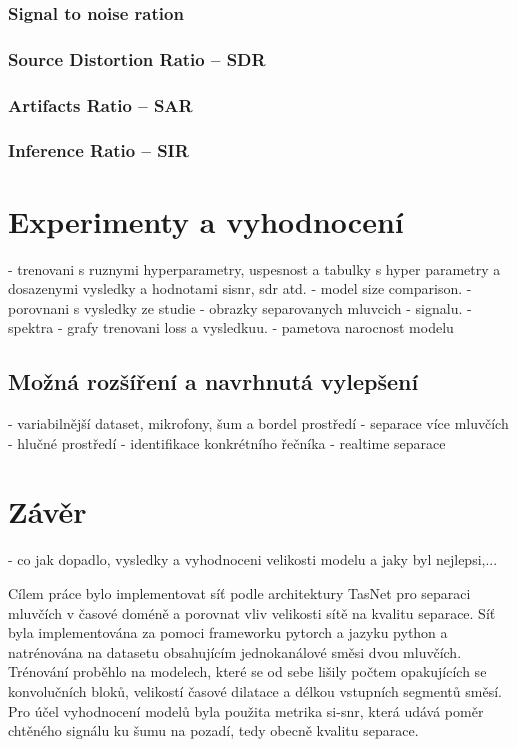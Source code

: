 \subsection{Signal to noise ration}
\subsection*{Source Distortion Ratio -- SDR}
\subsection*{Artifacts Ratio -- SAR}
\subsection*{Inference Ratio -- SIR}





\chapter{Experimenty a vyhodnocení}
\label{experimenty}
- trenovani s ruznymi hyperparametry, uspesnost a tabulky s hyper parametry a dosazenymi vysledky a hodnotami sisnr, sdr atd.
- model size comparison.
- porovnani s vysledky ze studie
- obrazky separovanych mluvcich - signalu.
- spektra
- grafy trenovani loss a vysledkuu.
- pametova narocnost modelu


\section{Možná rozšíření a navrhnutá vylepšení}
- variabilnější dataset, mikrofony, šum a bordel prostředí
- separace více mluvčích
- hlučné prostředí
- identifikace konkrétního řečníka
- realtime separace


\chapter{Závěr}
\label{zaver}
- co jak dopadlo, vysledky a vyhodnoceni velikosti modelu a jaky byl nejlepsi,...

Cílem práce bylo implementovat síť podle architektury TasNet pro separaci mluvčích v časové doméně a porovnat vliv velikosti sítě na kvalitu separace. Síť byla implementována za pomoci frameworku pytorch a jazyku python a natrénována na datasetu obsahujícím jednokanálové směsi dvou mluvčích. Trénování proběhlo na  modelech, které se od sebe lišily počtem opakujících se konvolučních bloků, velikostí časové dilatace a délkou vstupních segmentů směsí. Pro účel vyhodnocení modelů byla použita metrika si-snr, která udává poměr chtěného signálu ku šumu na pozadí, tedy obecně kvalitu separace. 


